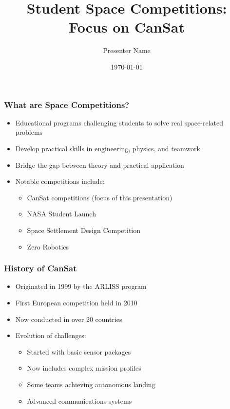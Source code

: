 \documentclass{beamer}
\title{Student Space Competitions:\\Focus on CanSat}
\author{Presenter Name}
\date{\today}
\begin{document}
\begin{frame}
\titlepage
\end{frame}

\begin{frame}
\frametitle{What are Space Competitions?}
\begin{itemize}
\item Educational programs challenging students to solve real space-related problems
\item Develop practical skills in engineering, physics, and teamwork
\item Bridge the gap between theory and practical application
\item Notable competitions include:
    \begin{itemize}
    \item CanSat competitions (focus of this presentation)
    \item NASA Student Launch
    \item Space Settlement Design Competition
    \item Zero Robotics
    \end{itemize}
\end{itemize}
\end{frame}

\begin{frame}
\frametitle{History of CanSat}
\begin{itemize}
\item Originated in 1999 by the ARLISS program
\item First European competition held in 2010
\item Now conducted in over 20 countries
\item Evolution of challenges:
    \begin{itemize}
    \item Started with basic sensor packages
    \item Now includes complex mission profiles
    \item Some teams achieving autonomous landing
    \item Advanced communications systems
    \end{itemize}
\end{itemize}
\end{frame}
\end{document}
